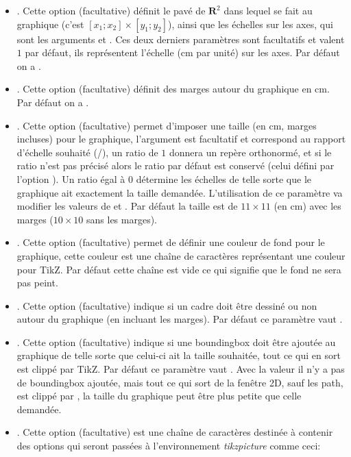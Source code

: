 \begin{itemize}
 \item {}. Cette option (facultative) définit le pavé de $\mathbf R^2$ dans lequel se fait au graphique (c'est $[x_1;x_2]\times[y_1;y_2]$), ainsi que les échelles sur les axes, qui sont les arguments  et . Ces deux derniers paramètres sont facultatifs et valent $1$ par défaut, ils représentent l'échelle (cm par unité) sur les axes. Par défaut on a .
 
\item {}. Cette option (facultative) définit des marges autour du graphique en cm. Par défaut on a .

\item {}. Cette option (facultative) permet d'imposer une taille (en cm, marges incluses) pour le graphique, l'argument  est facultatif et correspond au rapport d'échelle souhaité (/), un ratio de $1$ donnera un repère orthonormé, et si le ratio n'est pas précisé alors le ratio par défaut est conservé (celui défini par l'option ). Un ratio égal à $0$ détermine les échelles de telle sorte que le graphique ait exactement la taille demandée. L'utilisation de ce paramètre va modifier les valeurs de  et . Par défaut la taille est de $11\times11$ (en cm) avec les marges ($10\times10$ sans les marges).

\item {}. Cette option (facultative) permet de définir une couleur de fond pour le graphique, cette couleur est une chaîne de caractères représentant une couleur pour TikZ. Par défaut cette chaîne est vide ce qui signifie que le fond ne sera pas peint.

\item {}. Cette option (facultative) indique si un cadre doit être dessiné ou non autour du graphique (en incluant les marges). Par défaut ce paramètre vaut \false.

\item {}. Cette option (facultative) indique si une boundingbox doit être ajoutée au graphique de telle sorte que celui-ci ait la taille souhaitée, tout ce qui en sort est clippé par TikZ. Par défaut ce paramètre vaut \true. Avec la valeur \false il n'y a pas de boundingbox ajoutée, mais tout ce qui sort de la fenêtre 2D, sauf les path, est clippé par \luadrawenv, la taille du graphique peut être plus petite que celle demandée.

\item {}. Cette option (facultative) est une chaîne de caractères destinée à contenir des options qui seront passées à l'environnement \emph{tikzpicture} comme ceci:
\begin{TeXcode}
\begin{tikzpicture}[line join=round <,pictureoptions>]
\end{TeXcode}
\end{itemize}



